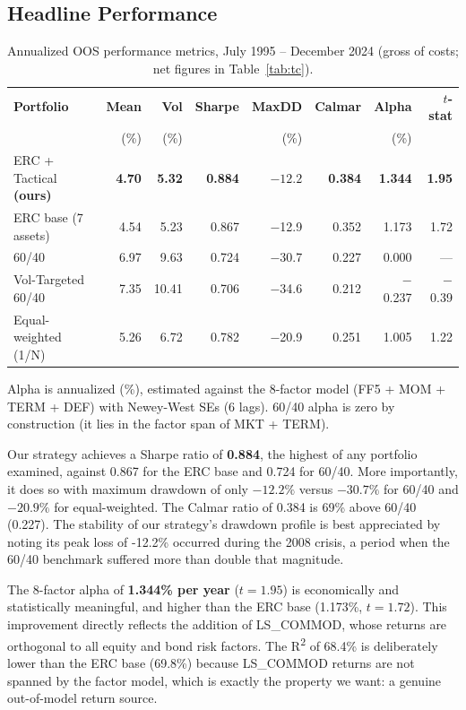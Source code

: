 \documentclass[11pt,letterpaper]{article}
\begin{document}
\subsection{Headline Performance}

\begin{table}[H]
\small\centering
\caption{Annualized OOS performance metrics, July 1995 -- December 2024 (gross of costs; net figures in Table~\ref{tab:tc}).}
\label{tab:perf}
\setlength{\tabcolsep}{5pt}
\begin{tabularx}{\linewidth}{Lrrrrrrr}
\toprule
\textbf{Portfolio} & \textbf{Mean} & \textbf{Vol} & \textbf{Sharpe} & \textbf{MaxDD} & \textbf{Calmar} & \textbf{Alpha} & \textbf{$t$-stat} \\
 & (\%) & (\%) & & (\%) & & (\%) & \\
\midrule
{}
ERC + Tactical \textbf{(ours)} & \textbf{4.70} & \textbf{5.32} & \textbf{0.884} & $\mathbf{-12.2}$ & \textbf{0.384} & \textbf{1.344} & \textbf{1.95} \\
ERC base (7 assets)     & 4.54 & 5.23 & 0.867 & $-$12.9 & 0.352 & 1.173 & 1.72 \\
60/40                   & 6.97 & 9.63 & 0.724 & $-$30.7 & 0.227 & 0.000 & --- \\
Vol-Targeted 60/40      & 7.35 & 10.41 & 0.706 & $-$34.6 & 0.212 & $-$0.237 & $-$0.39 \\
Equal-weighted (1/N)    & 5.26 & 6.72 & 0.782 & $-$20.9 & 0.251 & 1.005 & 1.22 \\
\bottomrule
\end{tabularx}
{\footnotesize Alpha is annualized (\%), estimated against the 8-factor model (FF5 + MOM + TERM + DEF) with Newey-West SEs (6 lags). 60/40 alpha is zero by construction (it lies in the factor span of MKT + TERM).}
\end{table}

Our strategy achieves a Sharpe ratio of \textbf{0.884}, the highest of any portfolio
examined, against 0.867 for the ERC base and 0.724 for 60/40. More importantly, it
does so with maximum drawdown of only $-12.2\%$ versus $-30.7\%$ for 60/40 and
$-20.9\%$ for equal-weighted. The Calmar ratio of 0.384 is 69\% above 60/40 (0.227). The stability of our strategy's drawdown profile is best appreciated by noting its peak loss of -12.2\% occurred during the 2008 crisis, a period when the 60/40 benchmark suffered more than double that magnitude.

The 8-factor alpha of \textbf{1.344\% per year} ($t = 1.95$) is economically and
statistically meaningful, and higher than the ERC base (1.173\%, $t = 1.72$).
This improvement directly reflects the addition of LS\_COMMOD, whose returns are
orthogonal to all equity and bond risk factors. The R\textsuperscript{2} of 68.4\%
is deliberately lower than the ERC base (69.8\%) because LS\_COMMOD returns are
not spanned by the factor model, which is exactly the property we want: a genuine
out-of-model return source.
\end{document}
